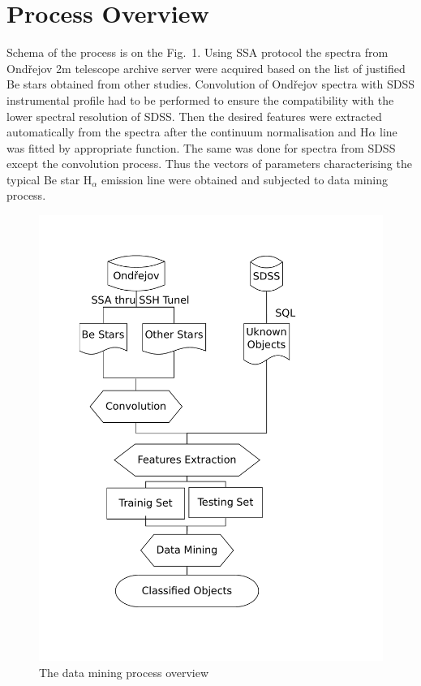 \documentclass[11pt,twoside]{article}
\begin{document}
\section{Process Overview}
Schema of the process is on the Fig.~1. Using SSA protocol the spectra
from Ond\v{r}ejov 2m telescope archive server were acquired based on the list of justified Be stars
obtained from other studies.  Convolution of Ond\v{r}ejov spectra with SDSS
instrumental profile had to be performed to
ensure the compatibility with the lower spectral resolution of SDSS. 
Then the desired features were extracted automatically
from the spectra after the continuum normalisation and H$\alpha$ line
was fitted by appropriate function. The same was done for spectra from
SDSS except the convolution process. Thus the vectors of parameters
characterising the typical Be star H$_\alpha$ emission line were obtained and
subjected to data mining process.
%
%
\begin{figure}[!htbp]
  \begin{center}
    \leavevmode
    \includegraphics[scale = .4]{flowSpectra}
    \caption{The data mining process overview}
    \label{FigStructure}
  \end{center}
\end{figure}
\end{document}
